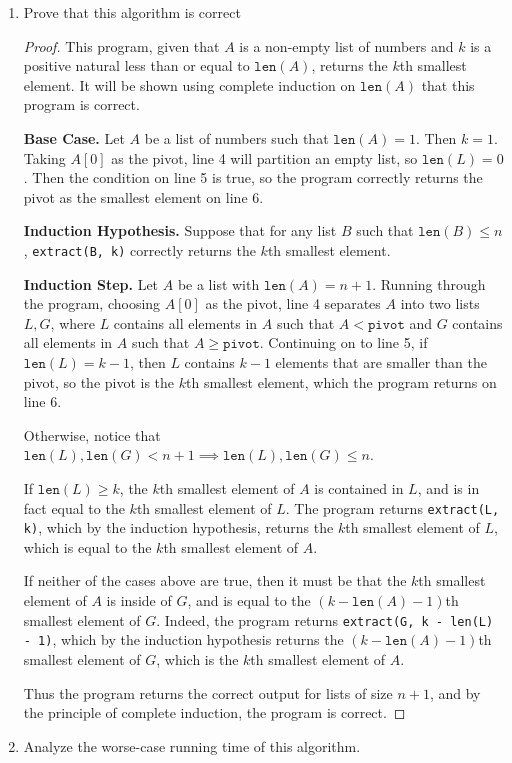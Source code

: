 \documentclass[11pt]{article}
\begin{document}
    \begin{enumerate}[label=(\alph*)]
        \item Prove that this algorithm is correct
        
        \begin{proof}
            This program, given that \(A\) is a non-empty list of numbers and \(k\) is a positive natural less than or equal to \(\texttt{len}(A)\), returns the \(k\)th smallest element. It will be shown using complete induction on \(\texttt{len}(A)\) that this program is correct.

            \textbf{Base Case.} Let \(A\) be a list of numbers such that \(\texttt{len}(A) = 1\). Then \(k=1\). Taking \(A[0]\) as the pivot, line 4 will partition an empty list, so \(\texttt{len}(L) = 0\). Then the condition on line 5 is true, so the program correctly returns the pivot as the smallest element on line 6.

            \textbf{Induction Hypothesis.} Suppose that for any list \(B\) such that \(\texttt{len}(B) \leq n\), \verb|extract(B, k)| correctly returns the \(k\)th smallest element.

            \textbf{Induction Step.} Let \(A\) be a list with \(\texttt{len}(A) = n + 1\). Running through the program, choosing \(A[0]\) as the pivot, line 4 separates \(A\) into two lists \(L,G\), where \(L\) contains all elements in \(A\) such that \(A < \texttt{pivot}\) and \(G\) contains all elements in \(A\) such that \(A \geq \texttt{pivot}\). Continuing on to line 5, if \(\texttt{len}(L) = k - 1\), then \(L\) contains \(k-1\) elements that are smaller than the pivot, so the pivot is the \(k\)th smallest element, which the program returns on line 6.

            Otherwise, notice that \(\texttt{len}(L),\texttt{len}(G) < n+1 \implies \texttt{len}(L),\texttt{len}(G) \leq n\).
            
            If \(\texttt{len}(L) \geq k\), the \(k\)th smallest element of \(A\) is contained in \(L\), and is in fact equal to the \(k\)th smallest element of \(L\). The program returns \verb|extract(L, k)|, which by the induction hypothesis, returns the \(k\)th smallest element of \(L\), which is equal to the \(k\)th smallest element of \(A\).

            If neither of the cases above are true, then it must be that the \(k\)th smallest element of \(A\) is inside of \(G\), and is equal to the \((k - \texttt{len}(A) - 1)\)th smallest element of \(G\). Indeed, the program returns \verb|extract(G, k - len(L) - 1)|, which by the induction hypothesis returns the \((k - \texttt{len}(A) - 1)\)th smallest element of \(G\), which is the \(k\)th smallest element of \(A\).

            Thus the program returns the correct output for lists of size \(n+1\), and by the principle of complete induction, the program is correct.
            
        \end{proof}
        \item Analyze the worse-case running time of this algorithm.
    \end{enumerate}
\end{document}
